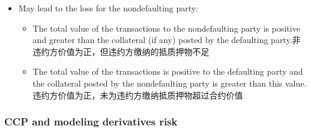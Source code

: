 \begin{itemize}
\begin{itemize}
\begin{itemize}
\item Default under the specified transaction特定交易下的违约
\item Cross-default(default on another obligation)交叉违约
\item Bankruptcy
\item Merger without assumption不承担义务的合并
\end{itemize}
\item May lead to the loss for the nondefaulting party:
\begin{itemize}
\item The total value of the transactions to the nondefaulting party is positive and greater than the collateral (if any) posted by the defaulting party.非违约方价值为正，但违约方缴纳的抵质押物不足
\item The total value of the transactions is positive to the defaulting party and the collateral posted by the nondefaulting party is greater than this value.违约方价值为正，未为违约方缴纳抵质押物超过合约价值
\end{itemize}
\end{itemize}
\end{itemize}

\subsubsection{CCP and modeling derivatives risk}


